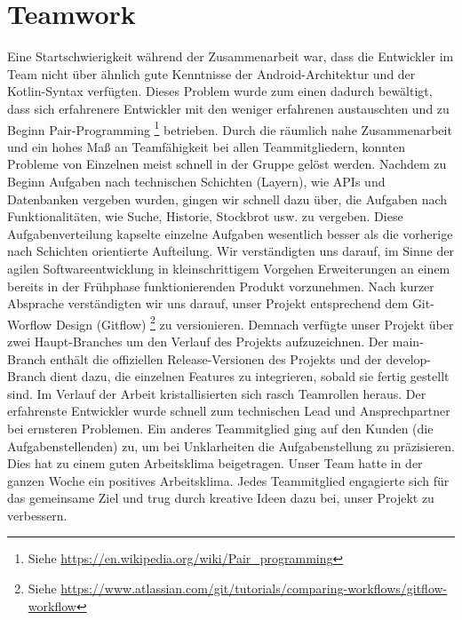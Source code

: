 \documentclass[a4paper]{article}
\begin{document}
\section{Teamwork}
\label{sec:teamwork}
Eine Startschwierigkeit während der Zusammenarbeit war, dass die Entwickler im Team nicht über ähnlich gute Kenntnisse der Android-Architektur und der Kotlin-Syntax verfügten. Dieses Problem wurde zum einen dadurch bewältigt, dass sich erfahrenere Entwickler mit den weniger erfahrenen austauschten und zu Beginn Pair-Programming \footnote{Siehe \url{https://en.wikipedia.org/wiki/Pair_programming}} betrieben. Durch die räumlich nahe Zusammenarbeit und ein hohes Maß an Teamfähigkeit bei allen Teammitgliedern, konnten Probleme von Einzelnen meist schnell in der Gruppe gelöst werden. Nachdem zu Beginn Aufgaben nach technischen Schichten (Layern), wie APIs und Datenbanken vergeben wurden, gingen wir schnell dazu über, die Aufgaben nach Funktionalitäten, wie Suche, Historie, Stockbrot usw. zu vergeben. Diese Aufgabenverteilung kapselte einzelne Aufgaben wesentlich besser als die vorherige nach Schichten orientierte Aufteilung. Wir verständigten uns darauf, im Sinne der agilen Softwareentwicklung in kleinschrittigem Vorgehen Erweiterungen an einem bereits in der Frühphase funktionierenden Produkt vorzunehmen. Nach kurzer Absprache verständigten wir uns darauf, unser Projekt entsprechend dem Git-Worflow Design (Gitflow) \footnote{Siehe \url{https://www.atlassian.com/git/tutorials/comparing-workflows/gitflow-workflow}} zu versionieren. Demnach verfügte unser Projekt über zwei Haupt-Branches um den Verlauf des Projekts aufzuzeichnen. Der main-Branch enthält die offiziellen Release-Versionen des Projekts und der develop-Branch dient dazu, die einzelnen Features zu integrieren, sobald sie fertig gestellt sind. \newline
Im Verlauf der Arbeit kristallisierten sich rasch Teamrollen heraus. Der erfahrenste Entwickler wurde schnell zum technischen Lead und Ansprechpartner bei ernsteren Problemen. Ein anderes Teammitglied ging auf den Kunden (die Aufgabenstellenden) zu, um bei Unklarheiten die Aufgabenstellung zu präzisieren. Dies hat zu einem guten Arbeitsklima beigetragen. \newline
Unser Team hatte in der ganzen Woche ein positives Arbeitsklima. Jedes Teammitglied engagierte sich für das gemeinsame Ziel und trug durch kreative Ideen dazu bei, unser Projekt zu verbessern.
\end{document}
